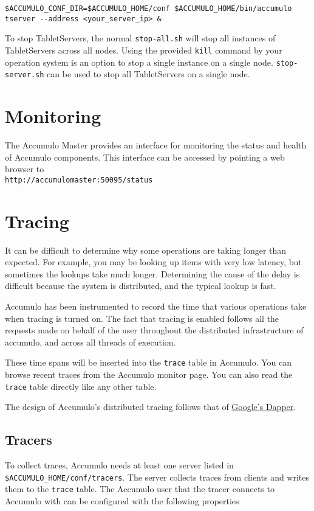 \begingroup\fontsize{8pt}{8pt}\selectfont\begin{verbatim}
$ACCUMULO_CONF_DIR=$ACCUMULO_HOME/conf $ACCUMULO_HOME/bin/accumulo tserver --address <your_server_ip> &
\end{verbatim}\endgroup

To stop TabletServers, the normal \texttt{stop-all.sh} will stop all instances of TabletServers across all nodes.
Using the provided \texttt{kill} command by your operation system is an option to stop a single instance on
a single node. \texttt{stop-server.sh} can be used to stop all TabletServers on a single node.

\section{Monitoring}

The Accumulo Master provides an interface for monitoring the status and health of
Accumulo components. This interface can be accessed by pointing a web browser to\\
\texttt{http://accumulomaster:50095/status}

\section{Tracing}
It can be difficult to determine why some operations are taking longer
than expected. For example, you may be looking up items with very low
latency, but sometimes the lookups take much longer. Determining the
cause of the delay is difficult because the system is distributed, and
the typical lookup is fast.

Accumulo has been instrumented to record the time that various
operations take when tracing is turned on. The fact that tracing is
enabled follows all the requests made on behalf of the user throughout
the distributed infrastructure of accumulo, and across all threads of
execution.

These time spans will be inserted into the \texttt{trace} table in
Accumulo. You can browse recent traces from the Accumulo monitor
page. You can also read the \texttt{trace} table directly like any
other table.

The design of Accumulo's distributed tracing follows that of
\href{http://research.google.com/pubs/pub36356.html}{Google's Dapper}.

\subsection{Tracers}
To collect traces, Accumulo needs at least one server listed in
\\\texttt{\$ACCUMULO\_HOME/conf/tracers}. The server collects traces
from clients and writes them to the \texttt{trace} table. The Accumulo
user that the tracer connects to Accumulo with can be configured with
the following properties

